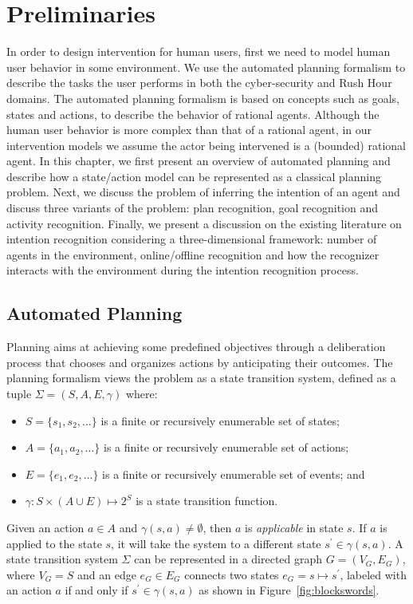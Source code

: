 \chapter{Preliminaries}
\label{chap:ch2}
In order to design intervention for human users, first we need to model human user behavior in some environment. 
We use the automated planning formalism \cite{nau2004} to describe the tasks the user performs in both the cyber-security and Rush Hour domains. 
The automated planning formalism is based on concepts such as goals, states and actions, to describe the behavior of rational agents. 
Although the human user behavior is more complex than that of a rational agent, in our intervention models we assume the actor being intervened is a (bounded) rational agent.
In this chapter, we first present an overview of automated planning and describe how a state/action model can be represented as a classical planning problem. Next, we discuss the problem of inferring the intention of an agent and discuss three variants of the problem: plan recognition, goal recognition and activity recognition. Finally, we present a discussion on the existing literature on intention recognition considering a three-dimensional framework: number of agents in the environment, online/offline recognition and how the recognizer interacts with the environment during the intention recognition process.

\section{Automated Planning}
Planning aims at achieving some predefined objectives through a deliberation process that chooses and organizes actions by anticipating their outcomes. The planning formalism views the problem as a state transition system, defined as a tuple $\Sigma=(S,A,E,\gamma)$ where:
\begin{itemize}
\item $S = \lbrace s_1, s_2, \ldots \rbrace$ is a finite or recursively enumerable set of states;
\item $A = \lbrace a_1, a_2, \ldots \rbrace$ is a finite or recursively enumerable set of actions;
\item $E = \lbrace e_1, e_2, \ldots \rbrace$ is a finite or recursively enumerable set of events; and
\item $\gamma: S\times(A\cup E)\mapsto 2^S$ is a state transition function.
\end{itemize}
Given an action $a\in A$ and $\gamma(s,a)\neq\emptyset$, then $a$ is \textit{applicable} in state $s$. If $a$ is applied to the state $s$, it will take the system to a different state $s^\prime\in \gamma(s,a)$. A state transition system $\Sigma$ can be represented in a directed graph $G=(V_G,E_G)$, where $V_G=S$ and an edge $e_G\in E_G$ connects two states $e_G=s\mapsto s^\prime$, labeled with an action $a$ if and only if $s^\prime \in \gamma(s,a)$ as shown in Figure~\ref{fig:blockswords}. 

